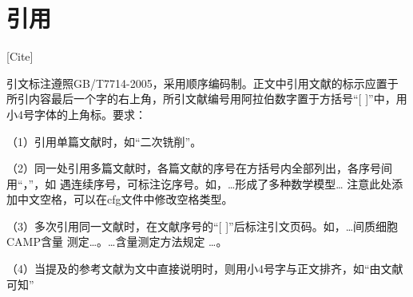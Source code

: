 

\section{引用}[Cite]

引文标注遵照GB/T7714-2005，采用顺序编码制。正文中引用文献的标示应置于所引内容最后一个字的右上角，所引文献编号用阿拉伯数字置于方括号“[ ]”中，用小4号字体的上角标。要求：

（1）引用单篇文献时，如“二次铣削\cite{cnproceed}”。

（2）同一处引用多篇文献时，各篇文献的序号在方括号内全部列出，各序号间用“，”，如
遇连续序号，可标注讫序号。如，…形成了多种数学模型\cite{cnarticle,cnproceed}…
注意此处添加中文空格，可以在cfg文件中修改空格类型。

（3）多次引用同一文献时，在文献序号的“[ ]”后标注引文页码。如，…间质细胞CAMP含量
测定\cite[100-197]{cnarticle}…。…含量测定方法规定
\cite[92]{cnarticle}…。

（4）当提及的参考文献为文中直接说明时，则用小4号字与正文排齐，如“由文献可知”

